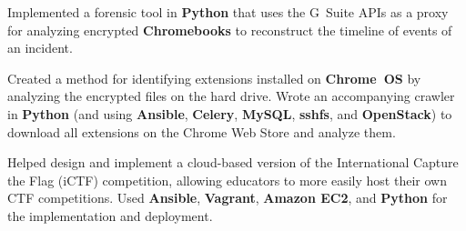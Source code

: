 


\begin{rExperience}


        \item Implemented a forensic tool in \textbf{Python} that uses the G~Suite APIs as a proxy for analyzing
          encrypted \textbf{Chromebooks} to reconstruct the timeline of events of an incident.

        \item Created a method for identifying extensions installed on \textbf{Chrome~OS} by analyzing the encrypted
          files on the hard drive. Wrote an accompanying crawler in \textbf{Python} (and using \textbf{Ansible},
          \textbf{Celery}, \textbf{MySQL}, \textbf{sshfs}, and \textbf{OpenStack}) to download all extensions on the
          Chrome Web Store and analyze them.

        \item Helped design and implement a cloud-based version of the International Capture the Flag (iCTF)
          competition, allowing educators to more easily host their own CTF competitions. Used \textbf{Ansible},
          \textbf{Vagrant}, \textbf{Amazon EC2}, and \textbf{Python} for the implementation and deployment.


\end{rExperience}
